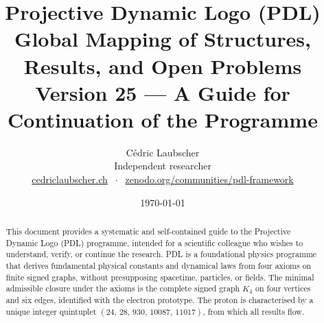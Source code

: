 \documentclass[11pt,a4paper]{article}
\title{Projective Dynamic Logo (PDL)\\[4pt]
\large Global Mapping of Structures, Results, and Open Problems\\[2pt]
\normalsize Version 25 --- A Guide for Continuation of the Programme}
\author{C\'edric Laubscher\\[4pt]
\small Independent researcher\\
\small \href{https://cedriclaubscher.ch}{cedriclaubscher.ch}
$\;\cdot\;$
\small \href{https://zenodo.org/communities/pdl-framework/}{zenodo.org/communities/pdl-framework}}
\date{\today}
\theoremstyle{plain}
\theoremstyle{definition}
\theoremstyle{remark}
\newcommand{\Kfour}{K_4}
\newcommand{\quintuplet}{(24,\,28,\,930,\,10087,\,11017)}
\begin{document}
\maketitle
\setcounter{tocdepth}{2}

\begin{abstract}
This document provides a systematic and self-contained guide to the Projective Dynamic Logo (PDL) programme, intended for a scientific colleague who wishes to understand, verify, or continue the research. PDL is a foundational physics programme that derives fundamental physical constants and dynamical laws from four axioms on finite signed graphs, without presupposing spacetime, particles, or fields. The minimal admissible closure under the axioms is the complete signed graph $\Kfour$ on four vertices and six edges, identified with the electron prototype. The proton is characterised by a unique integer quintuplet $\quintuplet$, from which all results flow.


\end{abstract}
\end{document}
